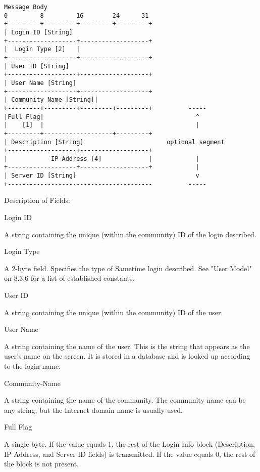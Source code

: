 \documentclass[titlepage,oneside]{book}
\begin{document}
\begin{verbatim}
Message Body
0         8         16        24      31
+---------+---------+---------+---------+
| Login ID [String]
+-------------------+-------------------+
|  Login Type [2]   |
+-------------------+-------------------+
| User ID [String]
+-------------------+-------------------+
| User Name [String]
+-------------------+-------------------+
| Community Name [String]|
+---------+---------+---------+---------+          -----
|Full Flag|                                          ^
|    [1]  |                                          |
+---------+-------------------+---------+
| Description [String]                       optional segment
+-------------------+-------------------+
|            IP Address [4]             |            |
+-------------------+-------------------+            |
| Server ID [String]                                 v
+----------------------------------------          -----
\end{verbatim}

\par{} Description of Fields:

\par{} Login ID
\par{}   A string containing the unique (within the community) ID of the
  login described.

\par{} Login Type
\par{}   A 2-byte field. Specifies the type of Sametime login described. See
  "User Model" on 8.3.6 for a list of established constants.

\par{} User ID
\par{}   A string containing the unique (within the community) ID of the
  user.

\par{} User Name
\par{}   A string containing the name of the user. This is the string that
  appears as the user's name on the screen. It is stored in a
  database and is looked up according to the login name.

\par{} Community-Name
\par{}   A string containing the name of the community. The community name
  can be any string, but the Internet domain name is usually used.

\par{} Full Flag
\par{}   A single byte. If the value equals 1, the rest of the Login Info
  block (Description, IP Address, and Server ID fields) is
  transmitted. If the value equals 0, the rest of the block is not
  present.
\end{document}
